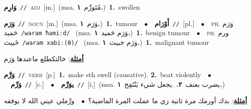 \documentclass[10pt,a4paper,twoside]{article} %
\begin{document}
\begin{multicols}{2}
{\setlength\topsep{0pt}\textbf{\foreignlanguage{arabic}{وَارِم}}\ {\color{gray}\texttt{//}\color{black}}\ \textsc{adj}\ [m.]\ \color{gray}(msa. \foreignlanguage{arabic}{مُتَورِّم}~\foreignlanguage{arabic}{\textbf{١.}})\color{black}\ \textbf{1.}~swollen\ } \vspace{2mm}

{\setlength\topsep{0pt}\textbf{\foreignlanguage{arabic}{وَرَم}}\ {\color{gray}\texttt{//}\color{black}}\ \textsc{noun}\ [m.]\ \color{gray}(msa. \foreignlanguage{arabic}{وَرَم}~\foreignlanguage{arabic}{\textbf{١.}})\color{black}\ \textbf{1.}~tumour\ \ $\bullet$\ \ \setlength\topsep{0pt}\textbf{\foreignlanguage{arabic}{أَوْرَام}}\ {\color{gray}\texttt{//}\color{black}}\ [pl.]\ \ $\bullet$\ \ \textsc{ph.} \color{gray} \foreignlanguage{arabic}{وَرَم حَميد}\color{black}\ {\color{gray}\texttt{/{\sffamily waram ħamiːd}/}\color{black}}\ \color{gray} (msa. \foreignlanguage{arabic}{وَرَم حَميد}~\foreignlanguage{arabic}{\textbf{١.}})\color{black}\ \textbf{1.}~benign tumour\ \ $\bullet$\ \ \textsc{ph.} \color{gray} \foreignlanguage{arabic}{ورم خَبيث}\color{black}\ {\color{gray}\texttt{/{\sffamily waram xabiː(θ)}/}\color{black}}\ \color{gray} (msa. \foreignlanguage{arabic}{وَرَم خبيث}~\foreignlanguage{arabic}{\textbf{١.}})\color{black}\ \textbf{1.}~malignant tumour\  \begin{flushright}\color{gray}\foreignlanguage{arabic}{\textbf{\underline{\foreignlanguage{arabic}{أمثلة}}}: خالتكطلع  ماعندها وَرَم}\end{flushright}\color{black}} \vspace{2mm}

{\setlength\topsep{0pt}\textbf{\foreignlanguage{arabic}{وَرَّم}}\ {\color{gray}\texttt{//}\color{black}}\ \textsc{verb}\ [p.]\ \textbf{1.}~make sth swell (causative).  \textbf{2.}~beat violently\ \ $\bullet$\ \ \setlength\topsep{0pt}\textbf{\foreignlanguage{arabic}{وَرِّم}}\ {\color{gray}\texttt{//}\color{black}}\ [c.]\ \ $\bullet$\ \ \setlength\topsep{0pt}\textbf{\foreignlanguage{arabic}{يوَرِّم}}\ {\color{gray}\texttt{//}\color{black}}\ [i.]\ \color{gray}(msa. \foreignlanguage{arabic}{يضرب بعنف}~\foreignlanguage{arabic}{\textbf{٢.}}  .\foreignlanguage{arabic}{يجعل شيء يَنْتَفِخ}~\foreignlanguage{arabic}{\textbf{١.}})\color{black}\  \begin{flushright}\color{gray}\foreignlanguage{arabic}{\textbf{\underline{\foreignlanguage{arabic}{أمثلة}}}: بدك أورمك مرة ثانية زي ما عملت المرة الماضية؟\ $\bullet$\ \  ورَّملي عيني الله لا يوفقه}\end{flushright}\color{black}} \vspace{2mm}


\end{multicols}
\end{document}
